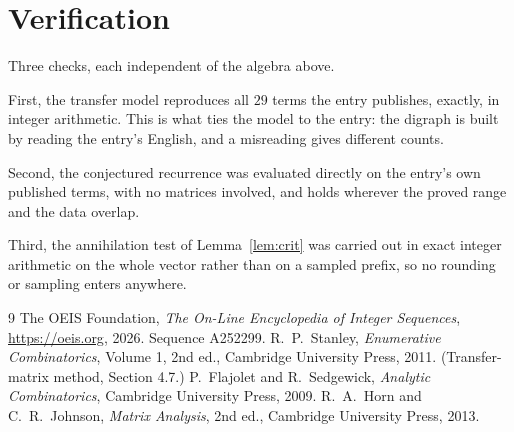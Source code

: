 \documentclass[11pt,a4paper]{article}
\theoremstyle{plain}
\theoremstyle{definition}
\begin{document}
\section{Verification}

Three checks, each independent of the algebra above.

First, the transfer model reproduces all $29$ terms the entry publishes, exactly, in
integer arithmetic. This is what ties the model to the entry: the digraph is built by reading
the entry's English, and a misreading gives different counts.

Second, the conjectured recurrence was evaluated directly on the entry's own published terms,
with no matrices involved, and holds wherever the proved range and the data overlap.

Third, the annihilation test of Lemma~\ref{lem:crit} was carried out in exact integer
arithmetic on the whole vector rather than on a sampled prefix, so no rounding or sampling
enters anywhere.

\begin{thebibliography}{9}
 The OEIS Foundation, \emph{The On-Line Encyclopedia of Integer
Sequences}, \url{https://oeis.org}, 2026. Sequence A252299.
 R.~P.~Stanley, \emph{Enumerative Combinatorics}, Volume 1, 2nd ed.,
Cambridge University Press, 2011. (Transfer-matrix method, Section 4.7.)
 P.~Flajolet and R.~Sedgewick, \emph{Analytic Combinatorics}, Cambridge
University Press, 2009.
 R.~A.~Horn and C.~R.~Johnson, \emph{Matrix Analysis}, 2nd ed., Cambridge
University Press, 2013.
\end{thebibliography}
\end{document}
